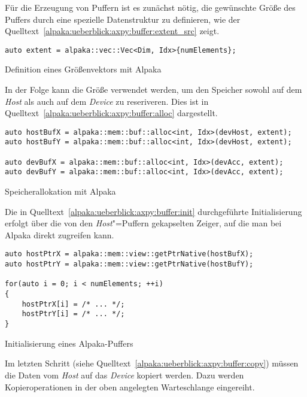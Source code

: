 Für die Erzeugung von Puffern ist es zunächst nötig, die gewünschte Größe des
Puffers durch eine spezielle Datenstruktur zu definieren, wie der
Quelltext~\ref{alpaka:ueberblick:axpy:buffer:extent_src} zeigt.

\begin{code}
    \begin{verbatim}
auto extent = alpaka::vec::Vec<Dim, Idx>{numElements};
    \end{verbatim}
    \caption{Definition eines Größenvektors mit Alpaka}
    \label{alpaka:ueberblick:axpy:buffer:extent_src}
\end{code}

In der Folge kann die Größe verwendet werden, um den Speicher sowohl auf dem
\textit{Host} als auch auf dem \textit{Device} zu reseriveren. Dies ist in
Quelltext~\ref{alpaka:ueberblick:axpy:buffer:alloc} dargestellt.

\begin{code}
    \begin{verbatim}
auto hostBufX = alpaka::mem::buf::alloc<int, Idx>(devHost, extent);
auto hostBufY = alpaka::mem::buf::alloc<int, Idx>(devHost, extent);

auto devBufX = alpaka::mem::buf::alloc<int, Idx>(devAcc, extent);
auto devBufY = alpaka::mem::buf::alloc<int, Idx>(devAcc, extent);
    \end{verbatim}
    \caption{Speicherallokation mit Alpaka}
    \label{alpaka:ueberblick:axpy:buffer:alloc}
\end{code}

Die in Quelltext~\ref{alpaka:ueberblick:axpy:buffer:init} durchgeführte
Initialisierung erfolgt über die von den \textit{Host}"=Puffern gekapselten
Zeiger, auf die man bei Alpaka direkt zugreifen kann.

\begin{code}
    \begin{verbatim}
auto hostPtrX = alpaka::mem::view::getPtrNative(hostBufX);
auto hostPtrY = alpaka::mem::view::getPtrNative(hostBufY);

for(auto i = 0; i < numElements; ++i)
{
    hostPtrX[i] = /* ... */;
    hostPtrY[i] = /* ... */;
}
    \end{verbatim}
    \caption{Initialisierung eines Alpaka-Puffers}
    \label{alpaka:ueberblick:axpy:buffer:init}
\end{code}

Im letzten Schritt (siehe Quelltext~\ref{alpaka:ueberblick:axpy:buffer:copy})
müssen die Daten vom \textit{Host} auf das \textit{Device} kopiert werden. Dazu
werden Kopieroperationen in der oben angelegten Warteschlange eingereiht.

